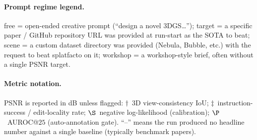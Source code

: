 \paragraph{Prompt regime legend.}
\textsf{free} = open-ended creative prompt (``design a novel
3DGS\ldots'');
\textsf{target} = a specific paper / GitHub repository URL was provided
at run-start as the SOTA to beat;
\textsf{scene} = a custom dataset directory was provided (Nebula,
Bubble, etc.) with the request to beat splatfacto on it;
\textsf{workshop} = a workshop-style brief, often without a single
PSNR target.

\paragraph{Metric notation.}
PSNR is reported in dB unless flagged: $\dagger$~3D view-consistency
IoU; $\ddagger$~instruction-success / edit-locality rate;
$\S$~negative log-likelihood (calibration);
$\P$~AUROC@$25$ (auto-annotation gate). ``--'' means the run produced
no headline number against a single baseline (typically benchmark
papers).

